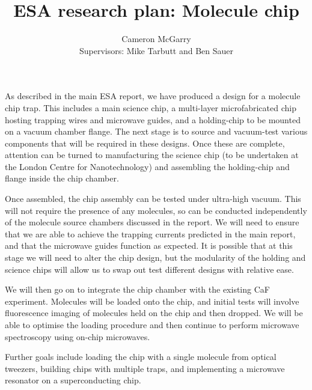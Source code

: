 \documentclass[a4paper]{article}
\title{ESA research plan: Molecule chip}
\author{Cameron McGarry\\ 
Supervisors: Mike Tarbutt and Ben Sauer}
\begin{document}
\maketitle

As described in the main ESA report, we have produced a design for a molecule
chip trap. This includes a main science chip, a multi-layer microfabricated chip
hosting trapping wires and microwave guides, and a holding-chip to be mounted on
a vacuum chamber flange. The next stage is to source and vacuum-test various
components that will be required in these designs. Once these are complete,
attention can be turned to manufacturing the science chip (to be undertaken at
the London Centre for Nanotechnology) and assembling the holding-chip and
flange inside the chip chamber.

Once assembled, the chip assembly can be tested under ultra-high vacuum. This
will not require the presence of any molecules, so can be conducted
independently of the molecule source chambers discussed in the report. We will
need to ensure that we are able to achieve the trapping currents predicted in
the main report, and that the microwave guides function as expected. It is
possible that at this stage we will need to alter the chip design, but the
modularity of the holding and science chips will allow us to swap out test
different designs with relative ease.

We will then go on to integrate the chip chamber with the existing CaF
experiment. Molecules will be loaded onto the chip, and initial tests will
involve fluorescence imaging of molecules held on the chip and then dropped.
We will be able to optimise the loading procedure and then continue to perform 
microwave spectroscopy using on-chip microwaves.

Further goals include loading the chip with a single molecule from optical
tweezers, building chips with multiple traps, and implementing a microwave
resonator on a superconducting chip.
\end{document}
